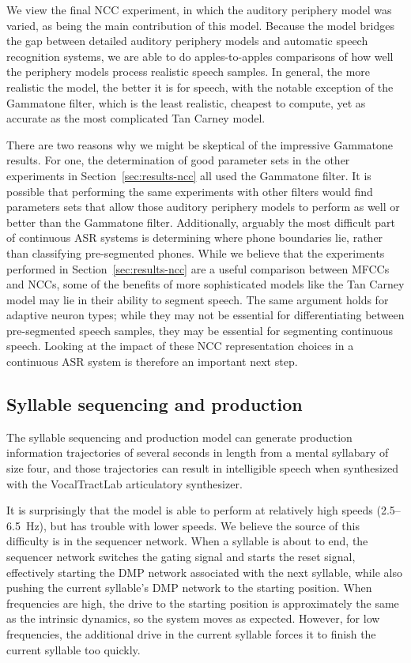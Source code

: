 We view the final NCC experiment,
in which the auditory periphery model was varied,
as being the main contribution
of this model.
Because the model bridges the gap
between detailed auditory periphery models
and automatic speech recognition systems,
we are able to do apples-to-apples comparisons
of how well the periphery models
process realistic speech samples.
In general, the more realistic the model,
the better it is for speech,
with the notable exception of the Gammatone filter,
which is the least realistic,
cheapest to compute,
yet as accurate as
the most complicated Tan Carney model.

There are two reasons why we might
be skeptical of the impressive Gammatone results.
For one, the determination of good parameter sets
in the other experiments in Section~\ref{sec:results-ncc}
all used the Gammatone filter.
It is possible that performing the same
experiments with other filters
would find parameters sets that
allow those auditory periphery models
to perform as well or better than
the Gammatone filter.
Additionally, arguably the most difficult part
of continuous ASR systems is
determining where phone boundaries lie,
rather than classifying pre-segmented phones.
While we believe that the experiments
performed in Section~\ref{sec:results-ncc}
are a useful comparison between MFCCs and NCCs,
some of the benefits of more sophisticated models
like the Tan Carney model
may lie in their ability to segment speech.
The same argument holds
for adaptive neuron types;
while they may not be essential
for differentiating between pre-segmented speech samples,
they may be essential for
segmenting continuous speech.
Looking at the impact of these
NCC representation choices
in a continuous ASR system
is therefore an important next step.

\subsection{Syllable sequencing and production}

The syllable sequencing and production model
can generate production information trajectories
of several seconds in length
from a mental syllabary of size four,
and those trajectories can result in
intelligible speech when synthesized
with the VocalTractLab articulatory synthesizer.

It is surprisingly that the model is able
to perform at relatively high speeds
(2.5--6.5~Hz),
but has trouble with lower speeds.
We believe the source of this difficulty
is in the sequencer network.
When a syllable is about to end,
the sequencer network
switches the gating signal
and starts the reset signal,
effectively starting the
DMP network associated with the next syllable,
while also pushing the current syllable's
DMP network to the starting position.
When frequencies are high,
the drive to the starting position
is approximately the same as the
intrinsic dynamics, so the system
moves as expected.
However, for low frequencies,
the additional drive in the current syllable
forces it to finish the current syllable
too quickly.

